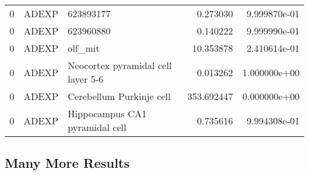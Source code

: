 \begin{tabular}{lllrr}
0 &       ADEXP &                           623893177 &     0.273030 &  9.999870e-01 \\
0 &       ADEXP &                           623960880 &     0.140222 &  9.999990e-01 \\
0 &       ADEXP &                             olf\_mit &    10.353878 &  2.410614e-01 \\
0 &       ADEXP &  Neocortex pyramidal cell layer 5-6 &     0.013262 &  1.000000e+00 \\
0 &       ADEXP &            Cerebellum Purkinje cell &   353.692447 &  0.000000e+00 \\
0 &       ADEXP &      Hippocampus CA1 pyramidal cell &     0.735616 &  9.994308e-01 \\
\bottomrule
\end{tabular}

\begin{table}

\caption[Comparable $\chi^{2}$ for optimized results of the conductance based model]{Comparable $\chi^{2}$ for optimized results of the conductance based model. Not all models could be evaluated, as optimization took a long time.}
\end{table}


\subsection{Many More Results}

